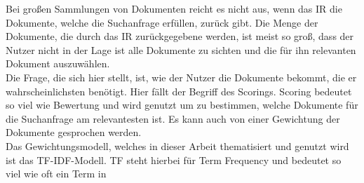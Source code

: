 Bei großen Sammlungen von Dokumenten reicht es nicht aus, wenn das IR die Dokumente, welche die Suchanfrage erfüllen, zurück gibt. Die Menge der Dokumente, die durch das IR zurückgegebene werden, ist meist so groß, dass der Nutzer nicht in der Lage ist alle Dokumente zu sichten und die für ihn relevanten Dokument auszuwählen.\\
Die Frage, die sich hier stellt, ist, wie der Nutzer die Dokumente bekommt, die er wahrscheinlichsten benötigt. Hier fällt der Begriff des Scorings. Scoring bedeutet so viel wie Bewertung und wird genutzt um zu bestimmen, welche Dokumente für die Suchanfrage am relevantesten ist. Es kann auch von einer Gewichtung der Dokumente gesprochen werden.\\
Das Gewichtungsmodell, welches in dieser Arbeit thematisiert und genutzt wird ist das TF-IDF-Modell. TF steht hierbei für Term Frequency und bedeutet so viel wie oft ein Term in 